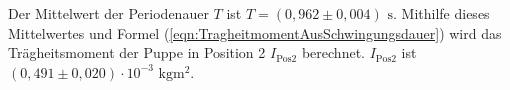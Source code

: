       Der Mittelwert der Periodenauer $T$ ist $T = (0,962 \pm 0,004)\,\, \unit{\second}$. 
      Mithilfe dieses Mittelwertes und Formel (\ref{eqn:TragheitmomentAusSchwingungsdauer}) wird das 
      Trägheitsmoment der Puppe in Position 2 $I_{\text{Pos2}}$ berechnet. 
      $I_{\text{Pos2}}$ ist $ (0,491 \pm 0,020) \cdot 10^{-3}\,\, \unit{\kilo\gram\meter\squared}$.
        

  
